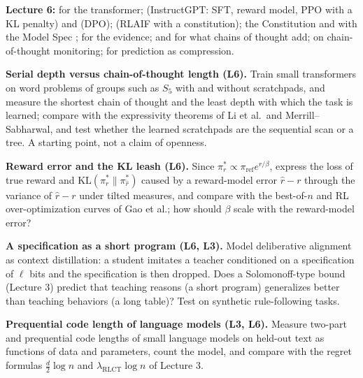 \textbf{Lecture 6:} \citet{vaswani2017} for the transformer; \citet{ouyang2022} (InstructGPT: SFT, reward model, PPO with a KL penalty) and \citet{rafailov2023} (DPO); \citet{bai2022} (RLAIF with a constitution); the Constitution \citep{anthropic2026constitution} and \citet{guan2024} with the Model Spec \citep{openai2026spec}; \citet{kutasov2026} for the evidence; \citet{li2024cot} and \citet{merrill2024cot} for what chains of thought add; \citet{korbak2025} on chain-of-thought monitoring; \citet{deletang2024} for prediction as compression.

\item \textbf{Serial depth versus chain-of-thought length (L6).} Train small transformers on word problems of groups such as $S_5$ with and without scratchpads, and measure the shortest chain of thought and the least depth with which the task is learned; compare with the expressivity theorems of Li et al.\ and Merrill--Sabharwal, and test whether the learned scratchpads are the sequential scan or a tree. A starting point, not a claim of openness.
\item \textbf{Reward error and the KL leash (L6).} Since $\pi^*_{r}\propto\pi_{\mathrm{ref}}e^{r/\beta}$, express the loss of true reward and $\mathrm{KL}(\pi^*_r\|\pi^*_{\hat r})$ caused by a reward-model error $\hat r-r$ through the variance of $\hat r-r$ under tilted measures, and compare with the best-of-$n$ and RL over-optimization curves of Gao et al.; how should $\beta$ scale with the reward-model error?
\item \textbf{A specification as a short program (L6, L3).} Model deliberative alignment as context distillation: a student imitates a teacher conditioned on a specification of $\ell$ bits and the specification is then dropped. Does a Solomonoff-type bound (Lecture 3) predict that teaching reasons (a short program) generalizes better than teaching behaviors (a long table)? Test on synthetic rule-following tasks.
\item \textbf{Prequential code length of language models (L3, L6).} Measure two-part and prequential code lengths of small language models on held-out text as functions of data and parameters, count the model, and compare with the regret formulas $\tfrac d2\log n$ and $\lambda_{\mathrm{RLCT}}\log n$ of Lecture 3.

